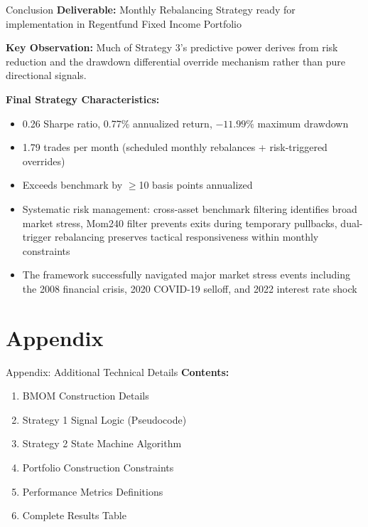\documentclass[aspectratio=169,10pt]{beamer}
\begin{document}
\begin{frame}{Conclusion}
\textbf{Deliverable:} Monthly Rebalancing Strategy ready for implementation in Regentfund Fixed Income Portfolio

\vspace{0.4cm}

\textbf{Key Observation:} Much of Strategy 3's predictive power derives from risk reduction and the drawdown differential override mechanism rather than pure directional signals.

\vspace{0.4cm}

\textbf{Final Strategy Characteristics:}
\begin{itemize}
    \item 0.26 Sharpe ratio, 0.77\% annualized return, $-11.99\%$ maximum drawdown
    \item 1.79 trades per month (scheduled monthly rebalances + risk-triggered overrides)
    \item Exceeds benchmark by $\geq$10 basis points annualized
    \item Systematic risk management: cross-asset benchmark filtering identifies broad market stress, Mom240 filter prevents exits during temporary pullbacks, dual-trigger rebalancing preserves tactical responsiveness within monthly constraints
    \item The framework successfully navigated major market stress events including the 2008 financial crisis, 2020 COVID-19 selloff, and 2022 interest rate shock
\end{itemize}
\end{frame}

\appendix

\section*{Appendix}

\begin{frame}{Appendix: Additional Technical Details}
\textbf{Contents:}

\vspace{0.3cm}

\begin{enumerate}
    \item BMOM Construction Details
    \item Strategy 1 Signal Logic (Pseudocode)
    \item Strategy 2 State Machine Algorithm
    \item Portfolio Construction Constraints
    \item Performance Metrics Definitions
    \item Complete Results Table
\end{enumerate}
\end{frame}
\end{document}
